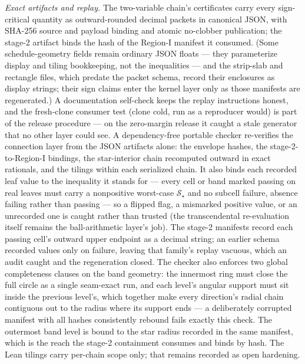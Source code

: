 \documentclass[11pt]{article}
\theoremstyle{remark}
\newcommand{\sS}{\mathcal{S}}
\begin{document}
\emph{Exact artifacts and replay.}  The two-variable chain's
certificates carry every
sign-critical quantity as outward-rounded decimal packets in
canonical JSON, with SHA-256 source and payload binding and atomic
no-clobber publication; the stage-2 artifact binds the hash of the
Region-I manifest it consumed.  (Some schedule-geometry fields
remain ordinary JSON floats --- they parameterize display and tiling
bookkeeping, not the inequalities --- and the strip-slab and
rectangle files, which predate the packet schema, record their
enclosures as display strings; their sign claims enter the kernel
layer only as those manifests are regenerated.)  A
documentation self-check keeps the replay instructions honest, and
the fresh-clone consumer test (clone cold, run as a reproducer
would) is part of the release procedure --- on the zero-margin
release it caught a stale generator that no other layer could see.
A dependency-free portable checker re-verifies the connection layer
from the JSON artifacts alone: the envelope hashes, the
stage-2-to-Region-I bindings, the star-interior chain recomputed
outward in exact rationals, and the tilings within each serialized
chain.  It also binds each recorded leaf value to the inequality it
stands for --- every cell or band marked passing on real leaves must
carry a nonpositive worst-case $\sS_\star$ and no subcell failure,
absence failing rather than passing --- so a flipped flag, a
mismarked positive value, or an unrecorded one is caught rather than
trusted (the transcendental re-evaluation itself remains the
ball-arithmetic layer's job).  The stage-2 manifests record each
passing cell's outward upper endpoint as a decimal string; an
earlier schema recorded values only on failure, leaving that
family's replay vacuous, which an audit caught and the
regeneration closed.  The checker also enforces two global
completeness clauses on
the band geometry: the innermost ring must close the full circle as
a single seam-exact run, and each level's angular support must sit
inside the previous level's, which together make every direction's
radial chain contiguous out to the radius where its support ends ---
a deliberately corrupted manifest with all hashes consistently
rebound fails exactly this check.  The outermost band level is bound
to the star radius recorded in the same manifest, which is the reach
the stage-2 containment consumes and binds by hash.  The Lean
tilings carry per-chain scope only; that remains recorded as open
hardening.
\end{document}
